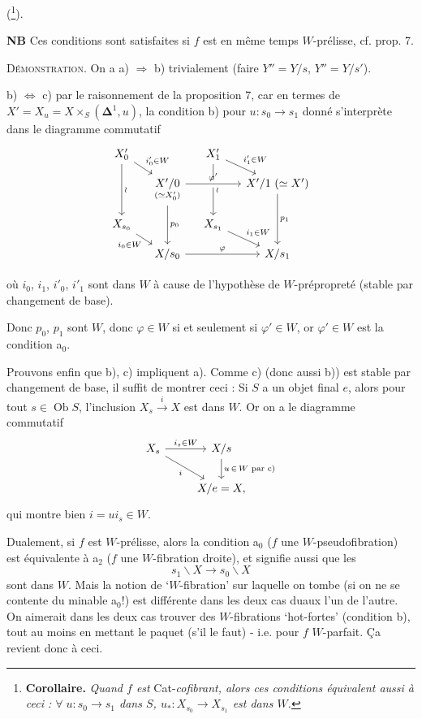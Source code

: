 \documentclass[11pt,leqno]{article}
\newcommand{\printedpage}[1]{\marginpar{\footnotesize p.~#1}}
\newcommand{\msp}[1]{\marginpar{\footnotesize [#1]}}
\newcommand{\fl}{\longrightarrow}
\newcommand{\Ob}{\operatorname{Ob}}
\begin{document}
(\footnote[49]{\textbf{Corollaire.} \textit{Quand $f$ est} Cat-\textit{cofibrant, alors ces conditions équivalent aussi à ceci : $\forall\; u : s_0\fl s_1$ dans $S$, $u_* : X_{s_0}\fl X_{s_1}$ est dans $W$.}}).

\printedpage{31}
\textbf{NB} Ces conditions sont satisfaites si $f$ est en même temps $W$-prélisse, cf. prop. 7.

\textsc{Démonstration}. On a a) $\Longrightarrow$ b) trivialement (faire $Y''=Y/s$, $Y''=Y/s'$).

b) $\Longleftrightarrow$ c) par le raisonnement de la proposition 7, car en termes de $X'=X_u=X\times_S(\boldsymbol{\Delta}^1,u)$, la condition b) pour $u : s_0\fl s_1$ donné s'interprète dans le diagramme commutatif
\[
\begin{tikzcd}[column sep=small, row sep=small]
X'_0 \arrow[dr, "i'_0\in W"] \arrow[dd, "\wr"] & & X'_1 \arrow[dr, "i'_1\in W"] \arrow[dd, "\wr"] & \\
 & \underset{(\simeq X'_0)}{X'/0} \arrow[rr, "\varphi'", crossing over] \arrow[dd, "p_0"] & & X'/1\ (\simeq X') \arrow[dd, "p_1"] \\
X_{s_0} \arrow[dr, "i_0\in W"'] & & X_{s_1} \arrow[dr, "i_1\in W"] & \\
 & X/s_0 \arrow[rr, "\varphi"] & & X/s_1
\end{tikzcd}
\]

 où $i_0$, $i_1$, $i'_0$, $i'_1$ sont dans $W$ à cause de l'hypothèse de $W$-prépropreté (stable par changement de base).

Donc $p_0$, $p_1$ sont $W$, donc $\varphi\in W$ si et seulement si $\varphi'\in W$, or $\varphi'\in W$ est la condition a$_0$.

\msp{page 42}Prouvons enfin que b), c) impliquent a). Comme c) (donc aussi b)) est stable par changement de base, il suffit de montrer ceci : Si $S$ a un objet final $e$, alors pour tout $s\in\Ob S$, l'inclusion $X_s\xrightarrow{\ i\ }X$ est dans $W$. Or on a le diagramme commutatif
\[
\begin{tikzcd}
X_s \arrow[r, "i_s\in W"] \arrow[dr, "i"'] & X/s \arrow[d, "u\,\in\,W\text{ par c) }"] \\
 & X/e=X,
\end{tikzcd}
\]
qui montre bien $i=ui_s\in W$.

Dualement, si $f$ est $W$-prélisse, alors la condition a$_0$ ($f$ une $W$-pseudofibration) est équivalente à a$_2$ ($f$ une $W$-fibration droite), et signifie aussi que les
\[ s_1\backslash X\fl s_0\backslash X \]
sont dans $W$. Mais la notion de ‘$W$-fibration’ sur laquelle on tombe (si on ne se contente du minable a$_0$!) est différente dans les deux cas duaux l'un de l'autre. On aimerait dans les deux cas trouver des $W$-fibrations ‘hot-fortes’ (condition b), tout au moins en mettant le paquet (s'il le faut) - i.e. pour $f$ $W$-parfait. Ça revient donc à ceci.
\end{document}

